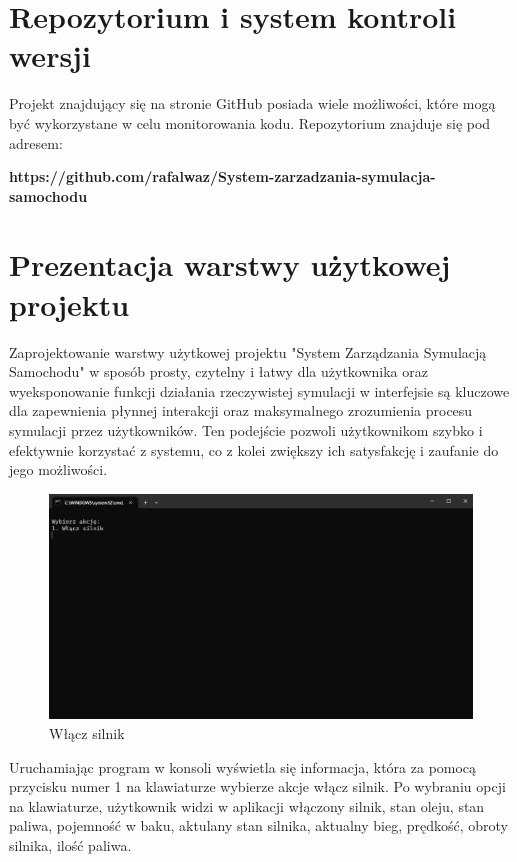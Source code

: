 \section{Repozytorium i system kontroli wersji}
Projekt znajdujący się na stronie GitHub posiada wiele możliwości, które mogą być wykorzystane w celu monitorowania kodu.
Repozytorium znajduje się pod adresem:

\textbf {https://github.com/rafalwaz/System-zarzadzania-symulacja-samochodu}

\section{Prezentacja warstwy użytkowej projektu}
Zaprojektowanie warstwy użytkowej projektu "System Zarządzania Symulacją Samochodu" w sposób prosty, czytelny i łatwy dla użytkownika oraz wyeksponowanie funkcji działania rzeczywistej symulacji w interfejsie są kluczowe dla zapewnienia płynnej interakcji oraz maksymalnego zrozumienia procesu symulacji przez użytkowników. Ten podejście pozwoli użytkownikom szybko i efektywnie korzystać z systemu, co z kolei zwiększy ich satysfakcję i zaufanie do jego możliwości.

\begin{figure}[!ht]
	\centering
		\includegraphics[width=17cm]{Włącz silnik.png}
	\caption{\footnotesize Włącz silnik}
	\label{fig:plotend}
\end{figure}

Uruchamiając program w konsoli wyświetla się informacja, która za pomocą przycisku numer 1 na klawiaturze wybierze akcje włącz silnik.
\newpage
Po wybraniu opcji na klawiaturze, użytkownik widzi w aplikacji włączony silnik, stan oleju, stan paliwa, pojemność w baku, aktulany stan silnika, aktualny bieg, prędkość, obroty silnika, ilość paliwa. 

